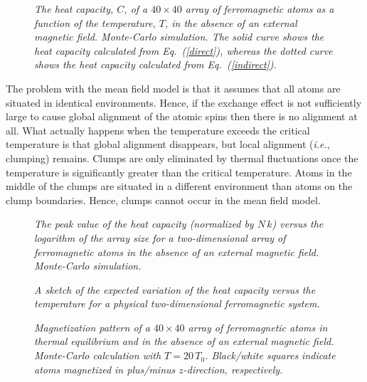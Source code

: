 \begin{figure}
\epsfysize=3in
\centerline{}
\caption{\em  The heat capacity, $C$, of a  $40\times 40$ array of ferromagnetic atoms as a
function of the temperature, $T$, in the absence of an external magnetic
field. Monte-Carlo simulation. The solid curve shows the heat capacity calculated
from Eq.~(\ref{direct}), whereas the dotted curve shows the heat capacity calculated
from Eq.~(\ref{indirect}). }\label{ff10}
\end{figure}

The problem with the mean field model is that it assumes that all atoms are situated
in identical environments. Hence, if the exchange effect is not sufficiently
large to cause global alignment of the atomic spins then there is no alignment at all.
What actually happens when the temperature exceeds the critical temperature
 is that global alignment disappears, but local
alignment ({\em i.e.}, clumping) remains. Clumps are only eliminated by thermal
fluctuations once the temperature is significantly greater than the
critical temperature. Atoms in the middle of the clumps
are situated in a different environment than atoms on the clump boundaries. Hence,
clumps cannot occur in the mean field model. 

\begin{figure}
\epsfysize=3in
\centerline{}
\caption{\em The peak value of the heat capacity (normalized by $N\,k$) versus the logarithm of
the array size for a two-dimensional array of ferromagnetic atoms in the absence
of an external magnetic field. Monte-Carlo simulation. }\label{cvmax}
\end{figure}

\begin{figure}
\epsfysize=2in
\centerline{}
\caption{\em A sketch of the expected variation  of the heat capacity versus
the temperature for a physical two-dimensional ferromagnetic system. }\label{sketch}
\end{figure}

\begin{figure}
\epsfysize=2in
\centerline{}
\caption{\em  Magnetization pattern of a $40\times 40$ array of ferromagnetic atoms in thermal
equilibrium and in the absence of an external magnetic field. Monte-Carlo calculation with $T=20\,T_0$.
Black/white squares indicate atoms magnetized in plus/minus $z$-direction, respectively.}\label{image1}
\end{figure}

